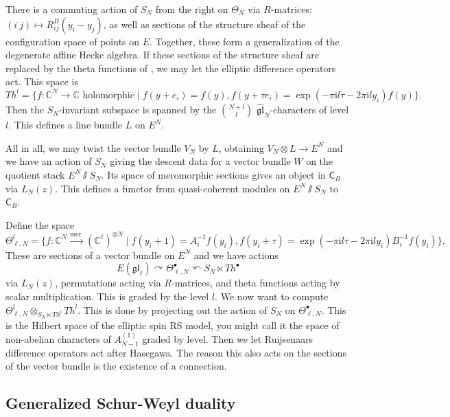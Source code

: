 \documentclass[11pt]{report}
\theoremstyle{definition}
\theoremstyle{remark}
\theoremstyle{remark}
\newcommand{\C}{\mathbb{C}}
\newcommand{\I}{\mathrm{i}}
\begin{document}
There is a commuting action of $S_N$ from the right on $\Theta_N$ via $R$-matrices: $(i \ j) \mapsto R_{ij}^B(y_i-y_j)$, as well as sections of the structure sheaf of the configuration space of points on $E$. Together, these form a generalization of the degenerate affine Hecke algebra. If these sections of the structure sheaf are replaced by the theta functions of \cite{article:hasegawa:1995}, we may let the elliptic difference operators act. This space is
\begin{equation*}
Th^l = \{ f: \C^N \to \C \text{ holomorphic} \mid f(y+e_i) = f(y), f(y+\tau e_i) = \exp(-\pi\I l\tau-2\pi\I l y_i) f(y) \}.
\end{equation*}
Then the $S_N$-invariant subspace is spanned by the ${N+l \choose l}$ $\hat{\mathfrak{gl}}_N$-characters of level $l$. This defines a line bundle $L$ on $E^N$.

All in all, we may twist the vector bundle $V_N$ by $L$, obtaining $V_N \otimes L \to E^N$ and we have an action of $S_N$ giving the descent data for a vector bundle $W$ on the quotient stack $E^N \sslash S_N$. Its space of meromorphic sections gives an object in $\mathsf{C}_B$ via $L_N(z)$. This defines a functor from quasi-coherent modules on $E^N \sslash S_N$ to $\mathsf{C}_B$.

Define the space
\begin{equation*}
\Theta_{\ell,N}^l = \{ f: \C^N \overset{\text{mer}.}\longrightarrow (\C^\ell)^{\otimes N} \mid f(y_i+1) = A_i^{-1} f(y_i), f(y_i+\tau) = \exp(-\pi\I l\tau-2\pi\I l y_i) B_i^{-1} f(y_i) \}.
\end{equation*}
These are sections of a vector bundle on $E^N$ and we have actions
\begin{equation*}
E(\mathfrak{gl}_\ell) \curvearrowright \Theta_{\ell,N}^\bullet \curvearrowleft S_N \ltimes Th^\bullet
\end{equation*}
via $L_N(z)$, permutations acting via $R$-matrices, and theta functions acting by scalar multiplication. This is graded by the level $l$. We now want to compute $\Theta_{\ell,N}^l \otimes_{S_N \ltimes Th^l} Th^l$. This is done by projecting out the action of $S_N$ on $\Theta_{\ell,N}^\bullet$. This is the Hilbert space of the elliptic spin RS model, you might call it the space of non-abelian characters of $A_{N-1}^{(1)}$ graded by level. Then we let Ruijsenaars difference operators act after Hasegawa. The reason this also acts on the sections of the vector bundle is the existence of a connection.

\subsection{Generalized Schur-Weyl duality}
\end{document}
